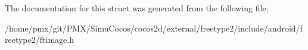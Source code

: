 The documentation for this struct was generated from the following file\+:\begin{DoxyCompactItemize}
\item 
/home/pmx/git/\+P\+M\+X/\+Simu\+Cocos/cocos2d/external/freetype2/include/android/freetype2/ftimage.\+h\end{DoxyCompactItemize}

